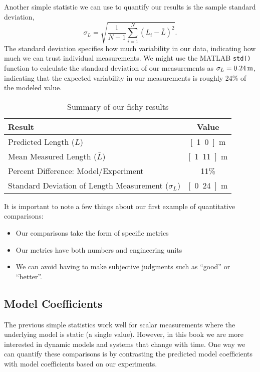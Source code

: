 Another simple statistic we can use to quantify our results is the \gls{sample standard deviation},
\begin{equation}\label{e:std}
\sigma_{L}=\sqrt{\frac{1}{N-1}\sum_{i=1}^{N}\left(L_i-\bar{L}\right)^2}.
\end{equation}
The standard deviation specifies how much variability in our data, indicating how much we can trust individual measurements.  We might use the MATLAB \texttt{std()} function to calculate the standard deviation of our measurements as $\sigma_L=\unit[0.24]{m}$, indicating that the expected variability in our measurements is roughly 24\% of the modeled value.  

\begin{table}[bt!] 
\renewcommand{\arraystretch}{1.2}
\caption{Summary of our fishy results}
\label{t:fishdata}
\centering
\begin{tabular}{|l|c|}\hline
Result & Value \\ \hline \hline
Predicted Length ($L$) & \unit[1.0]{m} \\ \hline
Mean Measured Length ($\bar{L}$) & \unit[1.11]{m} \\ \hline
Percent Difference: Model/Experiment & 11\% \\ \hline
Standard Deviation of Length Measurement ($\sigma_L$) & \unit[0.24]{m} \\ \hline
\end{tabular}
\end{table}

It is important to note a few things about our first example of quantitative comparisons:
\begin{itemize}
\item Our comparisons take the form of specific metrics
\item Our metrics have both numbers and engineering units
\item We can avoid having to make subjective judgments such as ``good'' or ``better''.
\end{itemize}

\subsection{Model Coefficients}
The previous simple statistics work well for scalar measurements where the underlying model is static (a single value).  However, in this book we are more interested in dynamic models and systems that change with time.  One way we can quantify these comparisons is by contrasting the predicted model coefficients with model coefficients based on our experiments.  


